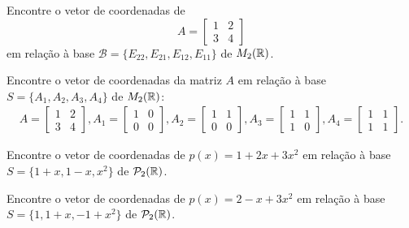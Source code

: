 \documentclass[12pt]{exam}
\begin{document}
    \begin{exercicio}
        Encontre o vetor de coordenadas de
        \[
        A = \begin{bmatrix}
            1 & 2\\
            3 & 4
        \end{bmatrix}
        \]
        em relação à base $\mathcal{B} = \{E_{22}, E_{21}, E_{12}, E_{11}\}$ de $M_2(\mathbb{R})$.
    \end{exercicio}

    \begin{exercicio}
        Encontre o vetor de coordenadas da matriz $A$ em relação à base $S = \{A_1, A_2, A_3, A_4\}$ de $M_2(\mathbb{R})$:
        \begin{align*}
            A = \begin{bmatrix}
                1 & 2\\
                3 & 4
            \end{bmatrix},
            A_1 = \begin{bmatrix}
                1 & 0\\
                0 & 0
            \end{bmatrix},
            A_2 = \begin{bmatrix}
                1 & 1\\
                0 & 0
            \end{bmatrix},
            A_3 = \begin{bmatrix}
                1 & 1\\
                1 & 0
            \end{bmatrix},
            A_4 = \begin{bmatrix}
                1 & 1\\
                1 & 1
            \end{bmatrix}.
        \end{align*}
    \end{exercicio}

    \begin{exercicio}
        Encontre o vetor de coordenadas de $p(x) = 1 + 2x + 3x^2$ em relação à base $S = \{1 + x, 1 - x, x^2\}$ de $\mathcal{P}_2(\mathbb{R})$.
    \end{exercicio}

    \begin{exercicio}
        Encontre o vetor de coordenadas de $p(x) = 2 - x + 3x^2$ em relação à base $S = \{1, 1 + x, -1 + x^2\}$ de $\mathcal{P}_2(\mathbb{R})$.
    \end{exercicio}
\end{document}
